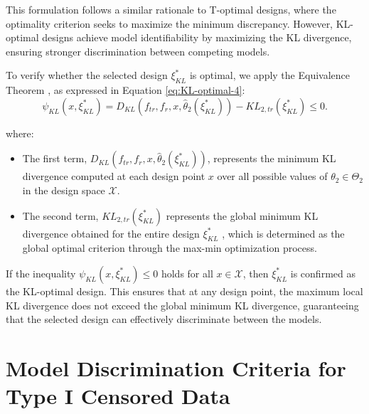 \hspace*{8mm} This formulation follows a similar rationale to T-optimal designs, where the optimality criterion seeks to maximize the minimum discrepancy. However, KL-optimal designs achieve model identifiability by maximizing the KL divergence, ensuring stronger discrimination between competing models.

\begin{theorem}
To verify whether the selected design $\xi_{KL}^\ast$ is optimal, we apply the Equivalence Theorem \citep{atkinson1975design,atkinson1975optimal}, as expressed in Equation \eqref{eq:KL-optimal-4}:
\begin{equation}\label{eq:KL-optimal-4}
\psi_{KL}(x,\xi_{KL}^\ast)=D_{KL}(f_{tr},f_r,x,\hat{\theta}_2(\xi_{KL}^\ast))-KL_{2,tr}(\xi_{KL}^\ast)\leq 0.
\end{equation}

where:
\begin{itemize}
\item The first term, $D_{KL}(f_{tr}, f_r, x, \hat{\theta}_2(\xi^*_{KL}))$, represents the minimum KL divergence computed at each design point $x$ over all possible values of $\theta_2 \in \Theta_2$ in the design space $\mathcal{X}$.

\item The second term, $KL_{2,tr}(\xi^*_{KL})$ represents the global minimum KL divergence obtained for the entire design $\xi^*_{KL}$ , which is determined as the global optimal criterion through the max-min optimization process.

\end{itemize}
\end{theorem}

\hspace*{8mm} If the inequality $\psi_{KL}(x, \xi^*_{KL}) \leq 0$ holds for all $x \in \mathcal{X}$, then $\xi^*_{KL}$ is confirmed as the KL-optimal design. This ensures that at any design point, the maximum local KL divergence does not exceed the global minimum KL divergence, guaranteeing that the selected design can effectively discriminate between the models.

\section{Model Discrimination Criteria for Type I Censored Data}

